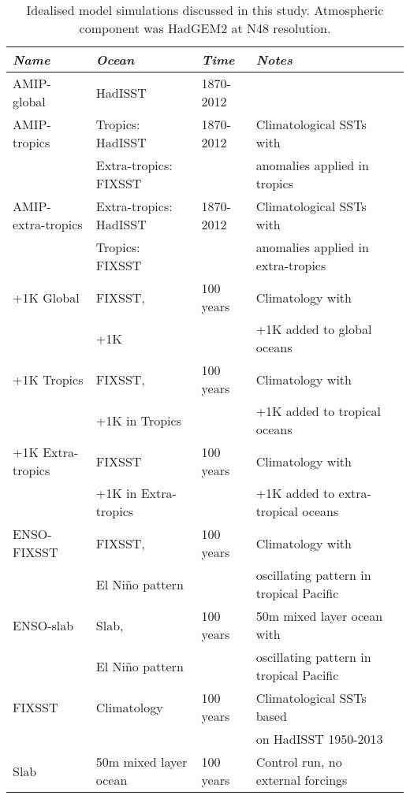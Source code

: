 \begin{center}
	\begin{table}[h]
		\caption{Idealised model simulations discussed in this study. Atmospheric 
		component was HadGEM2 at N48 resolution.}
		\label{tab:senseexp}
		\scriptsize
	\begin{tabular}{ l  l  l  l l}
		\textit{Name}		&  \textit{Ocean} & \textit{Time} &\textit{ Notes 
	}\\ 
	\hline \hline

	AMIP-global &    HadISST & 1870-2012 &  \\
	AMIP-tropics	   & Tropics: HadISST & 1870-2012 & Climatological SSTs with \\
		&Extra-tropics: FIXSST&& anomalies applied in tropics \\
	AMIP-extra-tropics     & Extra-tropics: HadISST & 1870-2012 & 
		Climatological SSTs with \\
		& Tropics: FIXSST && anomalies applied in extra-tropics  \\
\hline
	+1K Global    & FIXSST,  & 100 years & Climatology with \\
												 & +1K && +1K added to global oceans \\
	+1K Tropics     & FIXSST, & 100 years & Climatology with \\
												 & +1K in Tropics && +1K added to 
		tropical oceans \\
	+1K Extra-tropics	   & FIXSST & 100 years &Climatology with \\
											& +1K in Extra-tropics && +1K added to 
		extra-tropical oceans \\
\hline
	ENSO-FIXSST    &  FIXSST, & 100 years & Climatology with \\
											& El Ni{\~n}o pattern && oscillating 
		pattern in tropical Pacific\\
	ENSO-slab    & Slab,  & 100 years & 50m mixed layer ocean with \\
											& El Ni{\~n}o pattern && oscillating 
		pattern in tropical Pacific\\
\hline
	FIXSST    & Climatology & 100 years & Climatological SSTs based  \\
								  &&& on HadISST 1950-2013 \\
	Slab 	   & 50m mixed layer ocean & 100 years & Control run, no external 
		forcings \\
	\hline
	\end{tabular}
	\end{table}
\end{center}


